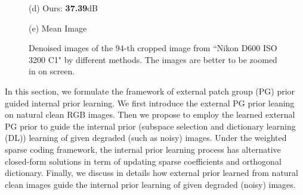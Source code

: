 \documentclass[10pt,twocolumn,letterpaper]{article}
\begin{document}
\begin{figure}
{\begin{minipage}[t]{0.195\textwidth}
{\footnotesize (d) Ours: \textbf{37.39}dB }
\end{minipage}
\begin{minipage}[t]{0.195\textwidth}
\centering
{}
{\footnotesize (e) Mean Image \cite{crosschannel2016}}
\end{minipage}
}
\caption{Denoised images of the $94$-th cropped image from ``Nikon D600 ISO 3200 C1" \cite{crosschannel2016} by different methods. The images are better to be zoomed in on screen.}
\vspace{-3mm}
\label{fig3}
\end{figure}

In this section, we formulate the framework of external patch group (PG) prior guided internal prior learning. We first introduce the external PG prior leaning on natural clean RGB images. Then we propose to employ the learned external PG prior to guide the internal prior (subspace selection and dictionary learning (DL)) learning of given degraded (such as noisy) images. Under the weighted sparse coding framework, the internal prior learning process has alternative closed-form solutions in term of updating sparse coefficients and orthogonal dictionary. Finally, we discuss in details how external prior learned from natural clean images guide the internal prior learning of given degraded (noisy) images.
\end{document}
